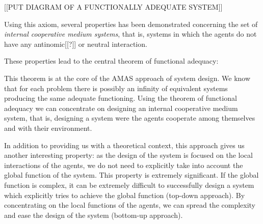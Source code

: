 [[PUT DIAGRAM OF A FUNCTIONALLY ADEQUATE SYSTEM]]

Using this axiom, several properties has been demonstrated concerning the set of \emph{internal cooperative medium systems}, that is, systems in which the agents do not have any antinomic[[?]] or neutral interaction.


%
%

These properties lead to the central theorem of functional adequacy:


This theorem is at the core of the AMAS approach of system design. We know that for each problem there is possibly an infinity of equivalent systems producing the same adequate functioning. Using the theorem of functional adequacy we can concentrate on designing an internal cooperative medium system, that is, designing a system were the agents cooperate among themselves and with their environment.

In addition to providing us with a theoretical context, this approach gives us another interesting property: as the design of the system is focused on the local interactions of the agents, we do not need to explicitly take into account the global function of the system. This property is extremely significant. If the global function is complex, it can be extremely difficult to successfully design a system which explicitly tries to achieve the global function (top-down approach). By concentrating on the local functions of the agents, we can spread the complexity and ease the design of the system (bottom-up approach).

